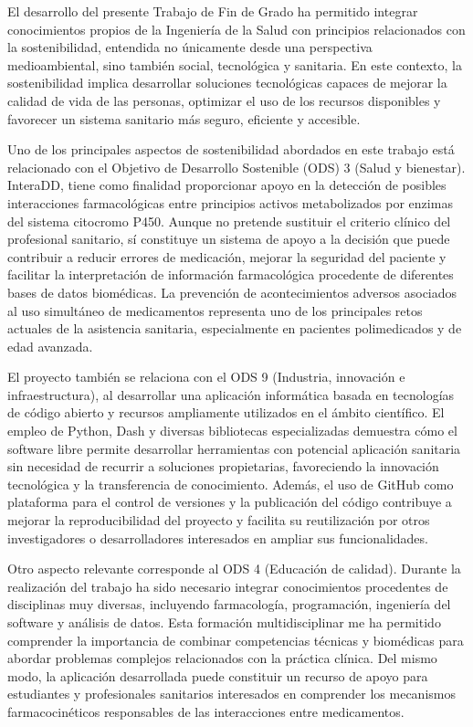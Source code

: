 
El desarrollo del presente Trabajo de Fin de Grado ha permitido integrar conocimientos propios de la Ingeniería de la Salud con principios relacionados con la sostenibilidad, entendida no únicamente desde una perspectiva medioambiental, sino también social, tecnológica y sanitaria. En este contexto, la sostenibilidad implica desarrollar soluciones tecnológicas capaces de mejorar la calidad de vida de las personas, optimizar el uso de los recursos disponibles y favorecer un sistema sanitario más seguro, eficiente y accesible.

Uno de los principales aspectos de sostenibilidad abordados en este trabajo está relacionado con el Objetivo de Desarrollo Sostenible (ODS) 3 (Salud y bienestar). InteraDD, tiene como finalidad proporcionar apoyo en la detección de posibles interacciones farmacológicas entre principios activos metabolizados por enzimas del sistema citocromo P450. Aunque no pretende sustituir el criterio clínico del profesional sanitario, sí constituye un sistema de apoyo a la decisión que puede contribuir a reducir errores de medicación, mejorar la seguridad del paciente y facilitar la interpretación de información farmacológica procedente de diferentes bases de datos biomédicas. La prevención de acontecimientos adversos asociados al uso simultáneo de medicamentos representa uno de los principales retos actuales de la asistencia sanitaria, especialmente en pacientes polimedicados y de edad avanzada.

El proyecto también se relaciona con el ODS 9 (Industria, innovación e infraestructura), al desarrollar una aplicación informática basada en tecnologías de código abierto y recursos ampliamente utilizados en el ámbito científico. El empleo de Python, Dash y diversas bibliotecas especializadas demuestra cómo el software libre permite desarrollar herramientas con potencial aplicación sanitaria sin necesidad de recurrir a soluciones propietarias, favoreciendo la innovación tecnológica y la transferencia de conocimiento. Además, el uso de GitHub como plataforma para el control de versiones y la publicación del código contribuye a mejorar la reproducibilidad del proyecto y facilita su reutilización por otros investigadores o desarrolladores interesados en ampliar sus funcionalidades.

Otro aspecto relevante corresponde al ODS 4 (Educación de calidad). Durante la realización del trabajo ha sido necesario integrar conocimientos procedentes de disciplinas muy diversas, incluyendo farmacología, programación, ingeniería del software y análisis de datos. Esta formación multidisciplinar me ha permitido comprender la importancia de combinar competencias técnicas y biomédicas para abordar problemas complejos relacionados con la práctica clínica. Del mismo modo, la aplicación desarrollada puede constituir un recurso de apoyo para estudiantes y profesionales sanitarios interesados en comprender los mecanismos farmacocinéticos responsables de las interacciones entre medicamentos.

